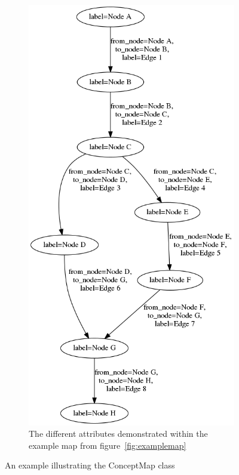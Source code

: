 \begin{figure}
\begin{subfigure}{0.4\textwidth}
        \includegraphics[height=.5\textheight]{img/examplemap_objects.png}
        \caption{The different attributes demonstrated within the example map from figure~\protect\ref{fig:examplemap}}
        \label{fig:examplemap_objects}
    \end{subfigure}
    \caption{An example illustrating the ConceptMap class}
    \label{fig:examplemaps}
\end{figure}

